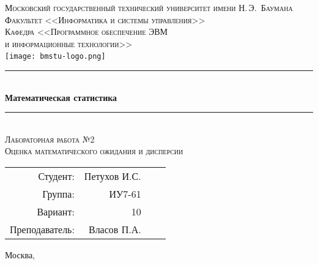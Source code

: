 \newcommand{\HRule}{\rule{\linewidth}{0.5mm}}

\begin{center}

\textsc{\large Московский государственный технический университет имени Н.\,Э.~Баумана}\\[0.5cm]
\textsc{Факультет <<Информатика и системы управления>>}\\
\textsc{Кафедра <<Программное обеспечение ЭВМ\\и информационные технологии>>}\\[0.25cm]

\texttt{[image: bmstu-logo.png]}~\\[2.25cm]



\HRule \\[0.5cm]
{\huge \bfseries Математическая статистика}
\HRule \\[0.5cm]

\textsc{\large Лабораторная работа №2}\\
\textsc{Оценка математического ожидания и дисперсии}

\vfill

\begin{flushright}
  \begin{tabular}{rrlc}
    Студент: & Петухов И.С.\\
    Группа: & ИУ7-61\\
    Вариант: & 10\\
    Преподаватель: & Власов П.А.\\
  \end{tabular}
\end{flushright}

{\large Москва, \the\year}

\end{center}

\newpage
{}